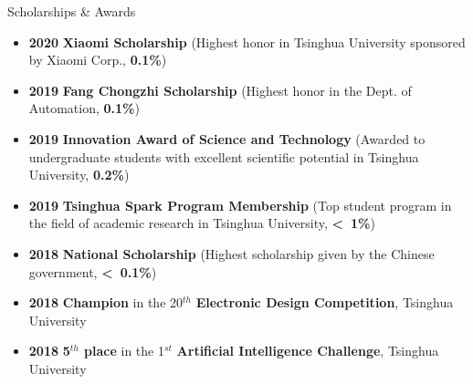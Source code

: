 \documentclass{resume} %
\begin{document}
\begin{rSection}{Scholarships \& Awards}
\begin{spacing}{1.05}
\begin{itemize}
    \item \textbf{2020} \textbf{Xiaomi Scholarship} (Highest honor in Tsinghua University sponsored by Xiaomi Corp., \textbf{0.1\%})
    \item \textbf{2019} \textbf{Fang Chongzhi Scholarship} (Highest honor in the Dept. of Automation, \textbf{0.1\%})
    \item \textbf{2019} \textbf{Innovation Award of Science and Technology} (Awarded to undergraduate students with excellent scientific potential in Tsinghua University, \textbf{0.2\%})
    \item \textbf{2019} \textbf{Tsinghua Spark Program Membership} (Top student program in the field of academic research in Tsinghua University, \textbf{\textless~1\%})
    \item \textbf{2018} \textbf{National Scholarship} (Highest scholarship given by the Chinese government, \textbf{\textless~0.1\%})
    \item \textbf{2018} \textbf{Champion} in the 20$^{th}$ \textbf{Electronic Design Competition}, Tsinghua University%
    \item \textbf{2018} \textbf{5$^{th}$ place} in the 1$^{st}$ \textbf{Artificial Intelligence Challenge}, Tsinghua University%
\end{itemize}
\end{spacing}

\end{rSection}
\end{document}
